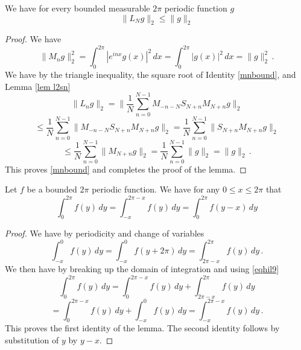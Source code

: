 \begin{lemma}
We have for every bounded measurable $2\pi$ periodic function $g$
\begin{equation}\label{lnbound}
    \|L_Ng\|_2\le \|g\|_2
\end{equation}
\end{lemma}
\begin{proof}
    We have
    \begin{equation}\label{mnbound}
        \|M_ng\|_2^2=\int _0^{2\pi} |e^{inx}g(x)|^2\, dx
        =\int _0^{2\pi} |g(x)|^2\, dx=\|g\|_2^2\, .
    \end{equation}
        We have by the triangle inequality, the square root of Identity \eqref{mnbound}, and Lemma \ref{lem l2sn}
    \begin{equation*}
        \|L_ng\|_2=\|\frac 1N\sum_{n=0}^{N-1}
        M_{-n-N} S_{N+n}M_{N+n}g\|_2
    \end{equation*}
    \begin{equation*}
        \le \frac 1N\sum_{n=0}^{N-1} \|
        M_{-n-N} S_{N+n}M_{N+n}g\|_2
            = \frac 1N\sum_{n=0}^{N-1} \|
    S_{N+n}M_{N+n}g\|_2
    \end{equation*}
        \begin{equation}
        \le \frac 1N\sum_{n=0}^{N-1} \|
    M_{N+n}g\|_2  = \frac 1N\sum_{n=0}^{N-1} \|
g\|_2 =\|g\|_2\, .
    \end{equation}
This proves \eqref{mnbound} and completes the proof of the lemma.
\end{proof}

\begin{lemma}\label{lem shift}
Let $f$ be a bounded $2\pi$ periodic function. We have for any
$0 \le x\le 2\pi$ that
\begin{equation}
    \int_0^{2\pi} f(y)\, dy= \int_{-x}^{2\pi -x}   f(y)\, dy
    =\int_{0}^{2\pi}   f(y-x)\, dy
\end{equation}
\end{lemma}
\begin{proof}
    We have  by periodicity and change of variables
    \begin{equation}\label{eqhil9}
    \int_{-x}^{0} f(y)\, dy=\int_{-x}^{0} f(y+2\pi)\, dy= \int_{2\pi -x}^{2\pi}   f(y)\, dy\, .
\end{equation}
We then have by breaking up the domain of integration
and using \eqref{eqhil9}
\begin{equation*}
    \int_0^{2\pi} f(y)\, dy= \int_0^{2\pi -x}   f(y)\, dy+
    \int_{2\pi -x}^{2\pi}   f(y)\, dy
    \end{equation*}
\begin{equation}
= \int_0^{2\pi -x}   f(y)\, dy+
    \int_{ -x}^{0}   f(y)\, dy
    = \int_{-x}^{2\pi-x} f(y)\, dy\, .
    \end{equation}
This proves the first identity of the lemma. The second identity follows by substitution of $y$ by $y-x$.
\end{proof}



